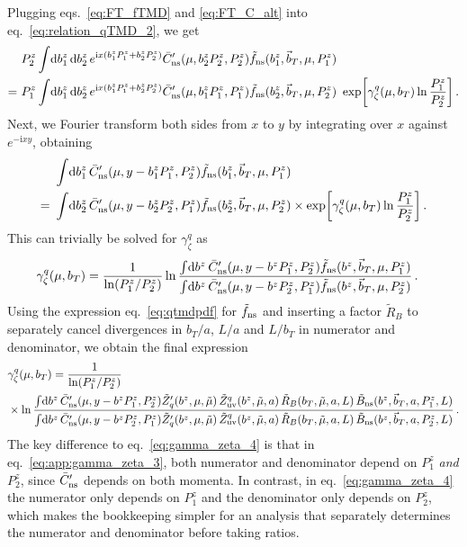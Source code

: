 \documentclass[11pt,a4paper]{article}
\DeclareRobustCommand{\eq}[1]{eq.~\eqref{eq:#1}}
\DeclareRobustCommand{\eqs}[2]{eqs.~\eqref{eq:#1} and \eqref{eq:#2}}
\newcommand{\df}{\mathrm{d}}
\newcommand{\img}{\mathrm{i}}
\newcommand{\cR}{{\tilde R}}
\newcommand{\nn}{\nonumber}
\newcommand{\bt}{\vec b_T}
\newcommand{\ns}{{\rm ns}}
\begin{document}
Plugging \eqs{FT_fTMD}{FT_C_alt} into \eq{relation_qTMD_2}, we get
\begin{align} \label{eq:app:relation_qTMD_2}
 &P^z_2 \int\!\df b^z_1 \, \df b^z_2 \, e^{\img x (b^z_1 P^z_1 + b^z_2 P^z_2)}
  \bar C_\ns^\prime(\mu, b^z_2 P^z_2, P^z_2) \tilde f_\ns(b^z_1, \bt, \mu, P^z_1)
 \\\nn=~&
  P^z_1 \int\!\df b^z_1 \, \df b^z_2 \, e^{\img x (b^z_1 P^z_1 + b^z_2 P^z_2)}
  \bar C_\ns^\prime(\mu, b^z_1 P^z_1, P^z_1) \tilde f_\ns(b^z_2, \bt, \mu, P^z_2)
  \ \exp\biggl[ \gamma_\zeta^q(\mu, b_T) \ln\frac{P^z_1}{P^z_2} \biggr]
\,.\end{align}
Next, we Fourier transform both sides from $x$ to $y$ by integrating over $x$ against $e^{-\img x y}$, obtaining
\begin{align} \label{eq:app:relation_qTMD_3}
 & \int\!\df b^z_1 \, \bar C_\ns^\prime(\mu, y - b^z_1 P^z_1, P^z_2) \tilde f_\ns(b^z_1, \bt, \mu, P^z_1)
 \\\nn=~&
  \int\! \df b^z_2 \, \bar C_\ns^\prime(\mu, y - b^z_2 P^z_2, P^z_1) \tilde f_\ns(b^z_2, \bt, \mu, P^z_2)
  \times \exp\biggl[ \gamma_\zeta^q(\mu, b_T) \ln\frac{P^z_1}{P^z_2} \biggr]
\,.\end{align}
This can trivially be solved for $\gamma_\zeta^q$ as
\begin{align} \label{eq:app:gamma_zeta_2}
 \gamma_\zeta^q(\mu, b_T) &=
 \frac{1}{\ln(P^z_1 / P^z_2)}
 \ln\frac{\int\!\df b^z \, \bar C_\ns^\prime(\mu, y - b^z P^z_1, P^z_2) \tilde f_\ns(b^z, \bt, \mu, P^z_1)}
         {\int\! \df b^z \, \bar C_\ns^\prime(\mu, y - b^z P^z_2, P^z_1) \tilde f_\ns(b^z, \bt, \mu, P^z_2)}
\,.\end{align}
Using the expression \eq{qtmdpdf} for $\tilde f_\ns$ and inserting a factor $\cR_B$
to separately cancel divergences in $b_T/a$, $L/a$ and $L/b_T$ in numerator and denominator, we obtain the final expression
\begin{align} \label{eq:app:gamma_zeta_3}
 &\gamma_\zeta^q(\mu, b_T) = \frac{1}{\ln(P^z_1/P^z_2)}
 \\\nn
&\times
 \ln\frac{\int\!\df b^z \, \bar C_\ns^\prime(\mu, y - b^z P^z_1, P^z_2) \tilde Z'_q(b^z,\mu,\tilde \mu)\,
 	\tilde Z_{\rm uv}^q(b^z,\tilde\mu,a) \, \cR_B(b_T,\tilde\mu,a,L) \, \tilde B_{\rm ns}(b^z, \bt, a, P^z_1, L)}
         {\int\! \df b^z \, \bar C_\ns^\prime(\mu, y - b^z P^z_2, P^z_1) \tilde Z'_q(b^z,\mu,\tilde \mu)\,
 	\tilde Z_{\rm uv}^q(b^z,\tilde\mu,a) \, \cR_B(b_T,\tilde\mu,a,L) \, \tilde B_{\rm ns}(b^z, \bt, a, P^z_2, L)}
\,.\end{align}
The key difference to \eq{gamma_zeta_4} is that in \eq{app:gamma_zeta_3}, both numerator and denominator depend on $P^z_1$ \emph{and} $P^z_2$, since $\bar C_\ns^\prime$ depends on both momenta.
In contrast, in \eq{gamma_zeta_4} the numerator only depends on $P^z_1$ and the denominator only depends on $P^z_2$, which makes the bookkeeping simpler for an analysis that separately determines the numerator and denominator before taking ratios.






\end{document}
